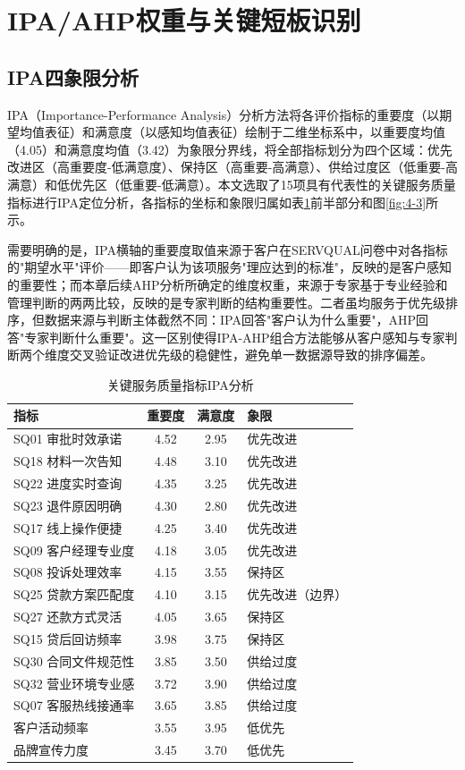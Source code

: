 \section{IPA/AHP权重与关键短板识别}

\subsection{IPA四象限分析}

IPA（Importance-Performance Analysis）分析方法将各评价指标的重要度（以期望均值表征）和满意度（以感知均值表征）绘制于二维坐标系中，以重要度均值（4.05）和满意度均值（3.42）为象限分界线，将全部指标划分为四个区域：优先改进区（高重要度-低满意度）、保持区（高重要-高满意）、供给过度区（低重要-高满意）和低优先区（低重要-低满意）。本文选取了15项具有代表性的关键服务质量指标进行IPA定位分析，各指标的坐标和象限归属如表\ref{tab:4-2}前半部分和图\ref{fig:4-3}所示。\par
需要明确的是，IPA横轴的重要度取值来源于客户在SERVQUAL问卷中对各指标的"期望水平"评价——即客户认为该项服务"理应达到的标准"，反映的是客户感知的重要性；而本章后续AHP分析所确定的维度权重，来源于专家基于专业经验和管理判断的两两比较，反映的是专家判断的结构重要性。二者虽均服务于优先级排序，但数据来源与判断主体截然不同：IPA回答"客户认为什么重要"，AHP回答"专家判断什么重要"。这一区别使得IPA-AHP组合方法能够从客户感知与专家判断两个维度交叉验证改进优先级的稳健性，避免单一数据源导致的排序偏差。\par

\begin{table}[htbp]
  \centering
  \small
  \caption{关键服务质量指标IPA分析}
  \label{tab:4-2}
  \begin{tabular}{l c c l}
    \toprule
    \textbf{指标} & \textbf{重要度} & \textbf{满意度} & \textbf{象限} \\
    \midrule
    SQ01 审批时效承诺 & 4.52 & 2.95 & 优先改进 \\
    SQ18 材料一次告知 & 4.48 & 3.10 & 优先改进 \\
    SQ22 进度实时查询 & 4.35 & 3.25 & 优先改进 \\
    SQ23 退件原因明确 & 4.30 & 2.80 & 优先改进 \\
    SQ17 线上操作便捷 & 4.25 & 3.40 & 优先改进 \\
    SQ09 客户经理专业度 & 4.18 & 3.05 & 优先改进 \\
    SQ08 投诉处理效率 & 4.15 & 3.55 & 保持区 \\
    SQ25 贷款方案匹配度 & 4.10 & 3.15 & 优先改进（边界） \\
    SQ27 还款方式灵活 & 4.05 & 3.65 & 保持区 \\
    SQ15 贷后回访频率 & 3.98 & 3.75 & 保持区 \\
    SQ30 合同文件规范性 & 3.85 & 3.50 & 供给过度 \\
    SQ32 营业环境专业感 & 3.72 & 3.90 & 供给过度 \\
    SQ07 客服热线接通率 & 3.65 & 3.85 & 供给过度 \\
    客户活动频率 & 3.55 & 3.95 & 低优先 \\
    品牌宣传力度 & 3.45 & 3.70 & 低优先 \\
    \bottomrule
  \end{tabular}
\end{table}

